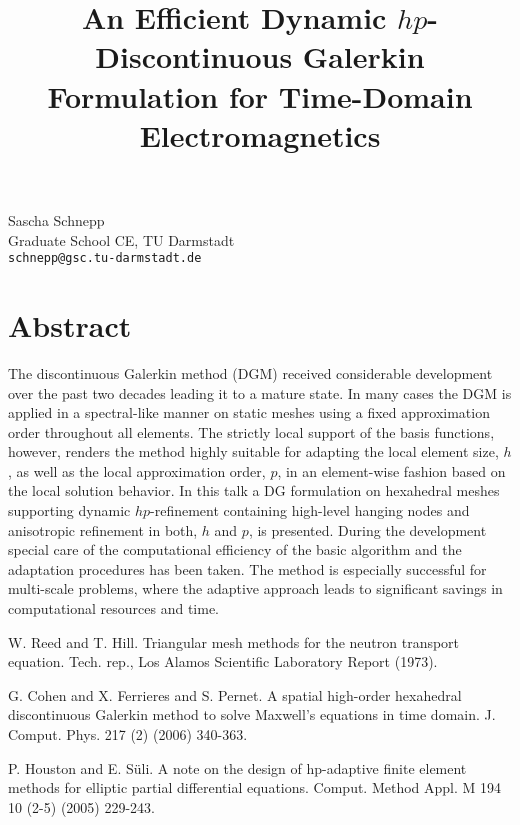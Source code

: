 \title{An Efficient Dynamic $hp$-Discontinuous Galerkin Formulation for Time-Domain Electromagnetics}
 \author{} \institute{}
\maketitle
\begin{center}
{\large Sascha Schnepp}\\
Graduate School CE, TU Darmstadt\\
{\tt schnepp@gsc.tu-darmstadt.de}

\end{center}

\section*{Abstract}

The discontinuous Galerkin method (DGM) \cite{reed} received considerable development over the past two decades leading it to a mature state. In many cases the DGM is applied in a spectral-like manner on static meshes using a fixed approximation order throughout all elements. The strictly local support of the basis functions, however, renders the method highly suitable for adapting the local element size, $h$, as well as the local approximation order, $p$, in an element-wise fashion based on the local solution behavior.
In this talk a DG formulation on hexahedral meshes \cite{cohen} supporting dynamic $hp$-refinement \cite{houston} containing high-level hanging nodes and anisotropic refinement in both, $h$ and $p$, is presented. During the development special care of the computational efficiency of the basic algorithm and the adaptation procedures has been taken. The method is especially successful for multi-scale problems, where the adaptive approach leads to significant savings in computational resources and time.


\begin{thebibliography}{10}

{\sc W. Reed and T. Hill}. {Triangular mesh methods for the neutron transport equation}. Tech. rep., Los Alamos Scientific Laboratory Report (1973).



{\sc G. Cohen and X. Ferrieres and S. Pernet}. {A spatial high-order hexahedral discontinuous Galerkin method to solve Maxwell's equations in time domain}. J. Comput. Phys. 217 (2) (2006) 340-363.



{\sc P. Houston and E. S\"uli}. {A note on the design of hp-adaptive finite element methods for elliptic partial differential equations}. Comput. Method Appl. M 194 10 (2-5) (2005) 229-243.

\end{thebibliography}

